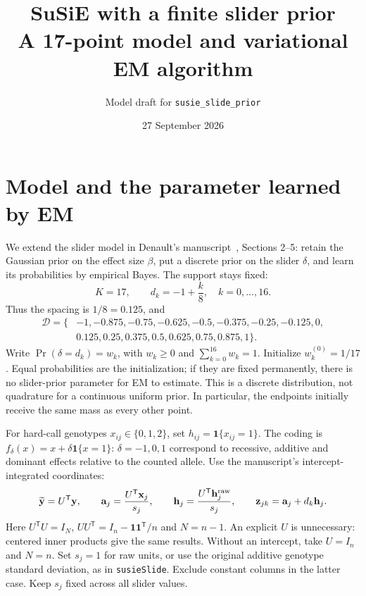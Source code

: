 \documentclass[11pt]{article}
\title{SuSiE with a finite slider prior\\\large A 17-point model and variational EM algorithm}
\author{Model draft for \texttt{susie\_slide\_prior}}
\date{27 September 2026}
\newcommand{\ind}{\mathbf 1}
\newcommand{\T}{^{\mathsf T}}
\newcommand{\yb}{\widetilde{\mathbf y}}
\begin{document}
\maketitle

\section{Model and the parameter learned by EM}
We extend the slider model in Denault's manuscript~\cite{slider},
Sections 2--5: retain the Gaussian prior on the effect size $\beta$,
put a discrete prior on the slider $\delta$, and learn its probabilities
by empirical Bayes. The support stays fixed:
\begin{equation}
 K=17,\qquad d_k=-1+\frac{k}{8},\quad k=0,\ldots,16.
 \label{eq:grid}
\end{equation}
Thus the spacing is $1/8=0.125$, and
\begin{align*}
\mathcal D=\{&-1,-0.875,-0.75,-0.625,-0.5,-0.375,-0.25,-0.125,0,\\
             &0.125,0.25,0.375,0.5,0.625,0.75,0.875,1\}.
\end{align*}
Write $\Pr(\delta=d_k)=w_k$, with $w_k\geq0$ and
$\sum_{k=0}^{16}w_k=1$. Initialize $w_k^{(0)}=1/17$.
Equal probabilities are the initialization; if they are fixed permanently,
there is no slider-prior parameter for EM to estimate. This is a discrete
distribution, not quadrature for a continuous uniform prior. In particular,
the endpoints initially receive the same mass as every other point.

For hard-call genotypes $x_{ij}\in\{0,1,2\}$, set
$h_{ij}=\ind\{x_{ij}=1\}$. The coding is
$f_\delta(x)=x+\delta\ind\{x=1\}$: $\delta=-1,0,1$ correspond to
recessive, additive and dominant effects relative to the counted allele.
Use the manuscript's intercept-integrated coordinates:
\begin{equation}
 \yb=U\T\mathbf y,\qquad
 \mathbf a_j=\frac{U\T\mathbf x_j}{s_j},\qquad
 \mathbf h_j=\frac{U\T\mathbf h_j^{\rm raw}}{s_j},\qquad
 \mathbf z_{jk}=\mathbf a_j+d_k\mathbf h_j.
 \label{eq:design}
\end{equation}
Here $U\T U=I_N$, $UU\T=I_n-\mathbf1\mathbf1\T/n$ and $N=n-1$.
An explicit $U$ is unnecessary: centered inner products give the same
results. Without an intercept, take $U=I_n$ and $N=n$.
Set $s_j=1$ for raw units, or use the original additive genotype standard
deviation, as in \texttt{susieSlide}. Exclude constant columns in the
latter case. Keep $s_j$ fixed across all slider values.
\end{document}
